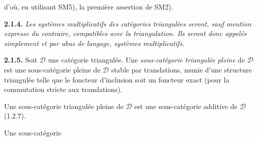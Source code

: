 \noindent d'où, en utilisant SM5), la première assertion de SM2).

\medskip
\noindent\textbf{2.1.4.}\quad
{}
\emph{Les systèmes multiplicatifs des catégories triangulées seront, sauf
mention expresse du contraire, compatibles avec la triangulation. Ils seront
donc appelés simplement et par abus de langage, systèmes multiplicatifs.}

\medskip
\noindent\textbf{2.1.5.}\quad
{}
Soit $\mathcal D$ une catégorie triangulée. Une \emph{sous-catégorie
triangulée pleine} de $\mathcal D$ est une sous-catégorie pleine de
$\mathcal D$ stable par translations, munie d'une structure triangulée telle
que le foncteur d'inclusion soit un foncteur exact (pour la commutation stricte
aux translations).

Une sous-catégorie triangulée pleine de $\mathcal D$ est une sous-catégorie
additive de $\mathcal D$ (1.2.7).

Une sous-catégorie
\endgroup
